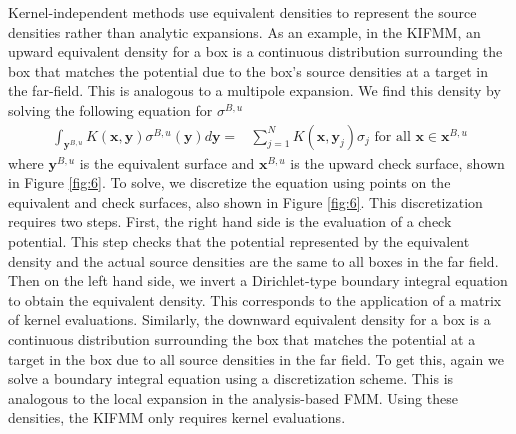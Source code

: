 \documentclass[11pt, oneside]{article}   	%
\begin{document}
Kernel-independent methods use equivalent densities to represent the source densities rather than analytic expansions. As an example, in the KIFMM, an upward equivalent density for a box is a continuous distribution surrounding the box that matches the potential due to the box's source densities at a target in the far-field. This is analogous to a multipole expansion. We find this density by solving the following equation for $\sigma^{B,u}$
\begin{align}
\int_{\mathbf{y}^{B,u}}{K(\mathbf{x},\mathbf{y})}\sigma^{B,u}{(\mathbf{y})}d\mathbf{y}=&\sum\limits_{j=1}^N K(\mathbf{x},\mathbf{y}_j)\sigma_j\mbox{ for all }\mathbf{x}\in\mathbf{x}^{B,u}
\end{align}
where $\mathbf{y}^{B,u}$ is the equivalent surface and $\mathbf{x}^{B,u}$ is the upward check surface, shown in Figure \ref{fig:6}. To solve, we discretize the equation using points on the equivalent and check surfaces, also shown in Figure \ref{fig:6}. This discretization requires two steps. First, the right hand side is the evaluation of a check potential. This step checks that the potential represented by the equivalent density and the actual source densities are the same to all boxes in the far field. Then on the left hand side, we invert a Dirichlet-type boundary integral equation to obtain the equivalent density. This corresponds to the application of a matrix of kernel evaluations. Similarly, the downward equivalent density for a box is a continuous distribution surrounding the box that matches the potential at a target in the box due to all source densities in the far field. To get this, again we solve a boundary integral equation using a discretization scheme. This is analogous to the local expansion in the analysis-based FMM. Using these densities, the KIFMM only requires kernel evaluations.
\end{document}
